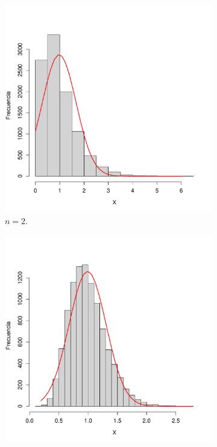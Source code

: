 \documentclass[paper=leter, fontsize=11pt]{scrartcl}
\begin{document}
\begin{figure}
  \begin{subfigure}{.5\textwidth}
      \centering
      \includegraphics[scale=0.4]{ej_2.pdf}
      \caption{$n = 2$.}
  \end{subfigure}
  \begin{subfigure}{.5\textwidth}
      \centering
      \includegraphics[scale=0.4]{ej_10.pdf}

\end{subfigure}
\end{figure}
\end{document}
